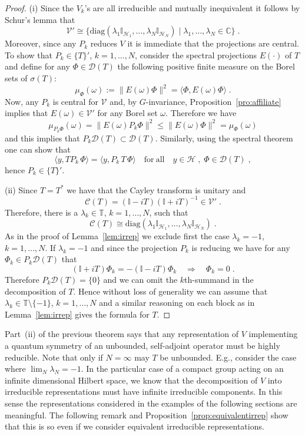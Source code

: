 \documentclass[a4paper,12pt]{amsart}
\renewcommand{\H}{\mathcal{H}}
\newcommand{\1}{\mathbb{I}}
\numberwithin{equation}{section}
\numberwithin{theorem}{section}
\begin{document}
\begin{proof}
(i) Since the $V_k$'s are all irreducible and mutually inequivalent it follows by Schur's lemma that
\[
 \mathcal{V}'\cong 
         \Big\{
         \mathrm{diag}\left( 
         \lambda_1\1_{\mathcal{H}_{1}}, \dots, \lambda_N\1_{\mathcal{H}_{N}}
                     \right)
         \mid \lambda_1,\dots,\lambda_N\in\mathbb{C}
         \Big\}\;.
\]
Moreover, since any $P_k$ reduces $V$ it is immediate that the projections are central. To show that
$P_k\in\{T\}'$, $k=1,\dots, N$, consider the spectral projections $E(\cdot)$ of $T$ and define for 
any $\Phi \in\mathcal{D}(T)$ the following positive finite measure on the Borel sets of $\sigma(T)$:
\[
 \mu_\Phi (\omega):=\|E(\omega)\Phi \|^2=\langle \Phi , E(\omega)\Phi \rangle\;.
\]
Now, any $P_k$ is central for $\mathcal V$ and, by $G$-invariance, Proposition~\ref{pro:affiliate} 
implies that $E(\omega)\in\mathcal{V}'$ for any Borel set $\omega$. Therefore we have
\[
 \mu_{P_k \Phi }(\omega) =\|E(\omega) P_k \Phi \|^2\leq \|E(\omega)\Phi \|^2=\mu_\Phi (\omega)
\]
and this implies that $P_k\mathcal{D}(T)\subset\mathcal{D}(T)$. Similarly, using the spectral theorem
one can show that
\[
 \langle y, TP_k\, \Phi \rangle =\langle y, P_k\, T \,\Phi \rangle\quad\mathrm{for~all}\quad y\in\H\;,\;\Phi \in\mathcal{D}(T)\;,
\]
hence $P_k\in\{T\}'$. 

(ii) Since $T=T^*$ we have that the Cayley transform is unitary and 
\[   
\mathcal{C}(T)=(\1-iT)(\1+iT)^{-1}\in\mathcal{V}'\;.
\]
Therefore, there is a $\lambda_k\in\mathbb{T}$, $k=1,\dots, N$, such that
\[
\mathcal{C}(T)\cong
\mathrm{diag}\left( 
         \lambda_1\1_{\mathcal{H}_{1}}, \dots, \lambda_N\1_{\mathcal{H}_{N}}
                     \right)\;.
\]
As in the proof of Lemma~\ref{lem:irrep} we exclude first the case $\lambda_k=-1$, $k=1,\dots, N$.
If $\lambda_k=-1$ and since the projection $P_k$ is reducing we have for any $\Phi _k\in P_k\mathcal{D}(T)$
that
\[
 (\1+iT)\Phi _k = -(\1-iT)\Phi _k \quad\Rightarrow\quad \Phi _k=0\;.
\]
Therefore $P_k\mathcal{D}(T)=\{0\}$ and we can omit the $k$th-summand in the decomposition of $T$.
Hence without loss of generality we can assume that $\lambda_k\in\mathbb{T}\setminus \{-1\}$,
$k=1,\dots, N$ and a similar reasoning on each block as in Lemma~\ref{lem:irrep} gives the formula for $T$.
\end{proof}


Part~(ii) of the previous theorem says that any representation of $V$ implementing a 
quantum symmetry of an unbounded, self-adjoint operator must be highly reducible. 
Note that only if $N=\infty$ may $T$ be unbounded. E.g., consider the case
where $\lim_N\lambda_N= -1$.
In the particular case of a compact group acting on an infinite dimensional
Hilbert space, we know that the decomposition of $V$ into irreducible representations must have infinite irreducible 
components.
In this sense the representations considered in the examples of the following sections are meaningful. 
The following remark and Proposition~\ref{prop:equivalentirrep} show that this is so even if we consider equivalent irreducible representations.
\end{document}
